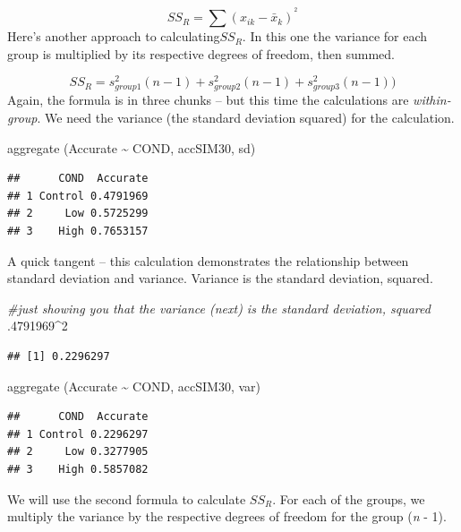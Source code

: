 \documentclass[
  english,
]{book}
\newenvironment{Shaded}{\begin{snugshade}}{\end{snugshade}}
\newcommand{\CommentTok}[1]{\textcolor[rgb]{0.56,0.35,0.01}{\textit{#1}}}
\newcommand{\DecValTok}[1]{\textcolor[rgb]{0.00,0.00,0.81}{#1}}
\newcommand{\FunctionTok}[1]{\textcolor[rgb]{0.00,0.00,0.00}{#1}}
\newcommand{\NormalTok}[1]{#1}
\newcommand{\SpecialCharTok}[1]{\textcolor[rgb]{0.00,0.00,0.00}{#1}}
\begin{document}
\[SS_{R}= \sum(x_{ik}-\bar{x}_{k})^{^{2}}\]
Here's another approach to calculating\(SS_R\). In this one the variance for each group is multiplied by its respective degrees of freedom, then summed.

\[SS_{R}= s_{group1}^{2}(n-1) + s_{group2}^{2}(n-1) + s_{group3}^{2}(n-1))\]
Again, the formula is in three chunks -- but this time the calculations are \emph{within-group}. We need the variance (the standard deviation squared) for the calculation.

\begin{Shaded}
\begin{Highlighting}[]
\FunctionTok{aggregate}\NormalTok{ (Accurate }\SpecialCharTok{\textasciitilde{}}\NormalTok{ COND, accSIM30, sd)}
\end{Highlighting}
\end{Shaded}

\begin{verbatim}
##      COND  Accurate
## 1 Control 0.4791969
## 2     Low 0.5725299
## 3    High 0.7653157
\end{verbatim}

A quick tangent -- this calculation demonstrates the relationship between standard deviation and variance. Variance is the standard deviation, squared.

\begin{Shaded}
\begin{Highlighting}[]
\CommentTok{\#just showing you that the variance (next) is the standard deviation, squared}
\NormalTok{.}\DecValTok{4791969}\SpecialCharTok{\^{}}\DecValTok{2}
\end{Highlighting}
\end{Shaded}

\begin{verbatim}
## [1] 0.2296297
\end{verbatim}

\begin{Shaded}
\begin{Highlighting}[]
\FunctionTok{aggregate}\NormalTok{ (Accurate }\SpecialCharTok{\textasciitilde{}}\NormalTok{ COND, accSIM30, var)}
\end{Highlighting}
\end{Shaded}

\begin{verbatim}
##      COND  Accurate
## 1 Control 0.2296297
## 2     Low 0.3277905
## 3    High 0.5857082
\end{verbatim}

We will use the second formula to calculate \(SS_R\). For each of the groups, we multiply the variance by the respective degrees of freedom for the group (\emph{n} - 1).
\end{document}

